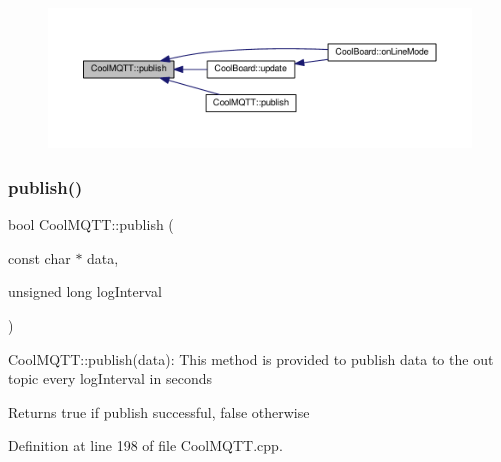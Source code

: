 \begin{figure}[H]
\begin{center}
\leavevmode
\includegraphics[width=350pt]{d0/dd0/class_cool_m_q_t_t_ace977b3e90ab14b1199fe5c4fb0a13ec_icgraph}
\end{center}
\end{figure}
\mbox{\label{class_cool_m_q_t_t_a613c5e3927ae85bb94fbf648d84d8780}} 
\subsubsection{\texorpdfstring{publish()}{publish()}\hspace{0.1cm}{\footnotesize\ttfamily [2/2]}}
{\footnotesize\ttfamily bool Cool\+M\+Q\+T\+T\+::publish (\begin{DoxyParamCaption}\item[{const char $\ast$}]{data,  }\item[{unsigned long}]{log\+Interval }\end{DoxyParamCaption})}

Cool\+M\+Q\+T\+T\+::publish(data)\+: This method is provided to publish data to the out topic every log\+Interval in seconds

\begin{DoxyReturn}{Returns}
true if publish successful, false otherwise 
\end{DoxyReturn}


Definition at line 198 of file Cool\+M\+Q\+T\+T.\+cpp.


